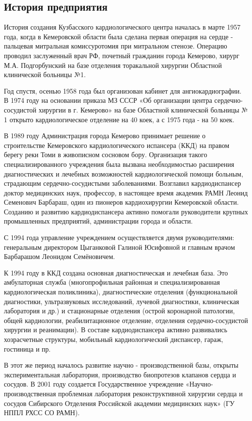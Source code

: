 \subsection{История предприятия}
История создания Кузбасского кардиологического центра началась в марте 1957
года, когда в Кемеровской области была сделана первая операция на сердце -
пальцевая митральная комиссуротомия при митральном стенозе. Операцию проводил
заслуженный врач РФ, почетный гражданин города Кемерово, хирург М.А.
Подгорбунский на базе отделения торакальной хирургии Областной клинической
больницы №1.

Год спустя, осенью 1958 года был организован кабинет для ангиокардиографии. В
1974 году на основании приказа МЗ СССР «Об организации центра
сердечно-сосудистой хирургии в г. Кемерово» на базе Областной клинической
больницы № 1 открыто кардиологическое отделение на 40 коек, а с 1975 года - на
50 коек.

В 1989 году Администрация города Кемерово принимает решение о строительстве
Кемеровского кардиологического  испансера (ККД) на правом берегу реки Томи в
живописном сосновом бору. Организация такого специализированного учреждения была
вызвана необходимостью расширения диагностических и лечебных возможностей
кардиологической помощи больным, страдающим сердечно-сосудистыми заболеваниями.
Возглавил кардиодиспансер доктор медицинских наук, профессор, в настоящее время
академик РАМН Леонид Семенович Барбараш, один из пионеров кардиохирургии
Кемеровской области. Созданию и развитию кардиодиспансера активно помогали
руководители крупных промышленных предприятий, администрации города и области.

С 1994 года управление учреждением осуществляется двумя руководителями:
генеральным директором Цыганковой Галиной Юсифовной и главным врачом Барбарашом
Леонидом Семёновичем.

К 1994 году в ККД создана основная диагностическая и лечебная база. Это
амбулаторная служба (многопрофильная районная и специализированная
кардиологическая поликлиника), диагностические отделения (функциональной
диагностики, ультразвуковых исследований, лучевой диагностики, клиническая
лаборатория и др.) и стационарные отделения (острой коронарной патологии, общей
кардиологии, реабилитационное отделение, отделения сердечно-сосудистой хирургии
и реанимации). В составе кардиодиспансера активно развивались хозрасчетные
структуры, мобильный кардиологический диспансер, гараж, гостиница и пр.
   
В этот же период началось развитие научно - производственной базы, открыты
экспериментальная лаборатория, производство биопротезов клапанов сердца и
сосудов. В 2001 году создается Государственное учреждение
«Научно-производственная проблемная лаборатория реконструктивной хирургии
сердца и сосудов Сибирского Отделения Российской академии медицинских наук»
(ГУ НППЛ РХСС СО РАМН).

